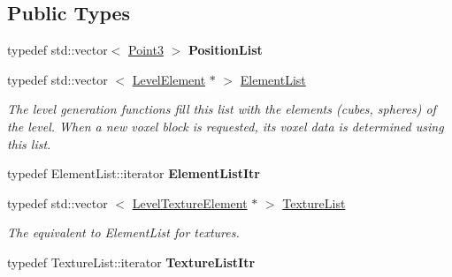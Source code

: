 \subsection*{\-Public \-Types}
\begin{DoxyCompactItemize}
\item 
\hypertarget{classLevel_af5225ae3dcc579a4b339c2c731cdb1ac}{
typedef std\-::vector$<$ \hyperlink{classPoint3}{\-Point3} $>$ {\bfseries \-Position\-List}}
\label{d2/d9d/classLevel_af5225ae3dcc579a4b339c2c731cdb1ac}

\item 
\hypertarget{classLevel_acfda2c619231d9623457ebb133ef6b84}{
typedef std\-::vector\*
$<$ \hyperlink{classLevelElement}{\-Level\-Element} $\ast$ $>$ \hyperlink{classLevel_acfda2c619231d9623457ebb133ef6b84}{\-Element\-List}}
\label{d2/d9d/classLevel_acfda2c619231d9623457ebb133ef6b84}

\begin{DoxyCompactList}\small\item\em \-The level generation functions fill this list with the elements (cubes, spheres) of the level. \-When a new voxel block is requested, its voxel data is determined using this list. \end{DoxyCompactList}\item 
\hypertarget{classLevel_a676b4b6c06284472d9042d259c0eeb48}{
typedef \-Element\-List\-::iterator {\bfseries \-Element\-List\-Itr}}
\label{d2/d9d/classLevel_a676b4b6c06284472d9042d259c0eeb48}

\item 
\hypertarget{classLevel_a428c83121a224ffd28a71b01d808352b}{
typedef std\-::vector\*
$<$ \hyperlink{classLevelTextureElement}{\-Level\-Texture\-Element} $\ast$ $>$ \hyperlink{classLevel_a428c83121a224ffd28a71b01d808352b}{\-Texture\-List}}
\label{d2/d9d/classLevel_a428c83121a224ffd28a71b01d808352b}

\begin{DoxyCompactList}\small\item\em \-The equivalent to \-Element\-List for textures. \end{DoxyCompactList}\item 
\hypertarget{classLevel_afda4dd48d5f4fb276d1254118c2350ec}{
typedef \-Texture\-List\-::iterator {\bfseries \-Texture\-List\-Itr}}
\label{d2/d9d/classLevel_afda4dd48d5f4fb276d1254118c2350ec}

\end{DoxyCompactItemize}
